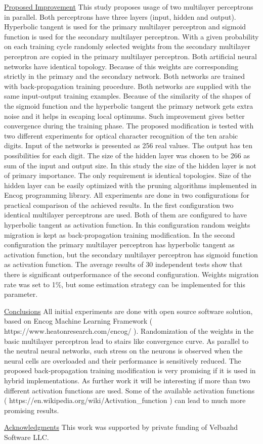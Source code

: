 \documentclass{article}
\begin{document}
\underline{Proposed Improvement} This study proposes usage of two multilayer perceptrons in parallel. Both perceptrons have three layers (input, hidden and output). Hyperbolic tangent is used for the primary multilayer perceptron and sigmoid function is used for the secondary multilayer perceptron. With a given probability on each training cycle randomly selected weights from the secondary multilayer perceptron are copied in the primary multilayer perceptron. Both artificial neural networks have identical topology. Because of this weights are corresponding strictly in the primary and the secondary network. Both networks are trained with back-propagation training procedure. Both networks are supplied with the same input-output training examples. Because of the similarity of the shapes of the sigmoid function and the hyperbolic tangent the primary network gets extra noise and it helps in escaping local optimums. Such improvement gives better convergence during the training phase. The proposed modification is tested with two different experiments for optical character recognition of the ten arabic digits. Input of the networks is presented as 256 real values. The output has ten possibilities for each digit. The size of the hidden layer was chosen to be 266 as sum of the input and output size. In this study the size of the hidden layer is not of primary importance. The only requirement is identical topologies. Size of the hidden layer can be easily optimized with the pruning algorithms implemented in Encog programming library. All experiments are done in two configurations for practical comparison of the achieved results. In the first configuration two identical multilayer perceptrons are used. Both of them are configured to have hyperbolic tangent as activation function. In this configuration random weights migration is kept as back-propagation training modification. In the second configuration the primary multilayer perceptron has hyperbolic tangent as activation function, but the secondary multilayer perceptron has sigmoid function as activation function. The average results of 30 independent tests show that there is significant outperformance of the second configuration. Weights migration rate was set to 1\%, but some estimation strategy can be implemented for this parameter. 
\vspace*{3mm}

\underline{Conclusions} All initial experiments are done with open source software solution, based on Encog Machine Learning Framework ( https://www.heatonresearch.com/encog/ ). Randomization of the weights in the basic multilayer perceptron lead to stairs like convergence curve. As parallel to the neutral neural networks, such stress on the neurons is observed when the neural cells are overloaded and their performance is sensitively reduced. The proposed back-propagation training modification is very promising if it is used in hybrid implementations. As further work it will be interesting if more than two different activation functions are used. Some of the available activation functions ( https://en.wikipedia.org/wiki/Activation\_function ) can lead to much more promising results.
\vspace*{5mm}

\underline{Acknowledgments} This work was supported by private funding of Velbazhd Software LLC.
\end{document}
